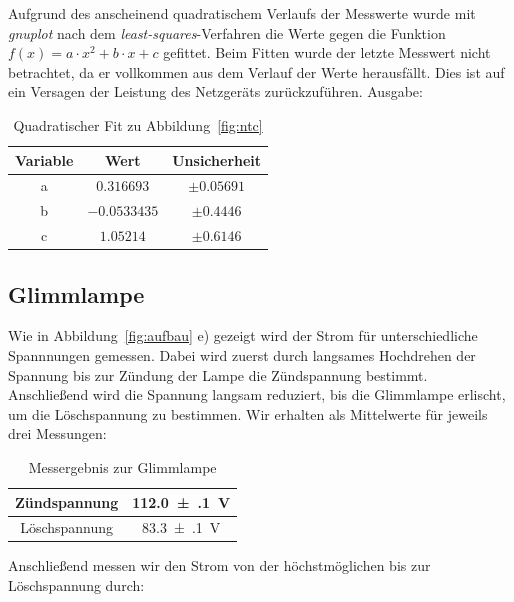 Aufgrund des anscheinend quadratischem Verlaufs der Messwerte wurde mit \emph{gnuplot} nach dem \emph{least-squares}-Verfahren die Werte gegen die Funktion $f(x)=a\cdot x^2+b\cdot x+c$ gefittet. Beim Fitten wurde der letzte Messwert nicht betrachtet, da er vollkommen aus dem Verlauf der Werte herausfällt. Dies ist auf ein Versagen der Leistung des Netzgeräts zurückzuführen. Ausgabe:
\begin{table}[H]
  \centering
  \begin{tabular}{c | c | c }
    Variable   & Wert & Unsicherheit\\ \hline
    a & $\num{0,316693}$ & $\pm\num{0,05691}$ \\
    b & $\num{-0,0533435}$ & $\pm\num{0,4446}$ \\
    c & $\num{1,05214}$ & $\pm\num{0,6146}$ \\
  \end{tabular}
  \caption{Quadratischer Fit zu Abbildung~\ref{fig:ntc}}
  \label{tab:fitntc}
\end{table}
\subsection{Glimmlampe}
Wie in Abbildung~\ref{fig:aufbau} e) gezeigt wird der Strom für unterschiedliche Spannnungen gemessen. Dabei wird zuerst durch langsames Hochdrehen der Spannung bis zur Zündung der Lampe die Zündspannung bestimmt. Anschließend wird die Spannung langsam reduziert, bis die Glimmlampe erlischt, um die Löschspannung zu bestimmen. Wir erhalten als Mittelwerte für jeweils drei Messungen:
\begin{table}[H]
  \centering
  \begin{tabular}{c | c}
    Zündspannung & \SI{112.0(1)}{V} \\ \hline
    Löschspannung & \SI{83.3(1)}{V} \\
  \end{tabular}
  \caption{Messergebnis zur Glimmlampe}
  \label{tab:glimm}
\end{table}

Anschließend messen wir den Strom von der höchstmöglichen bis zur Löschspannung durch:

